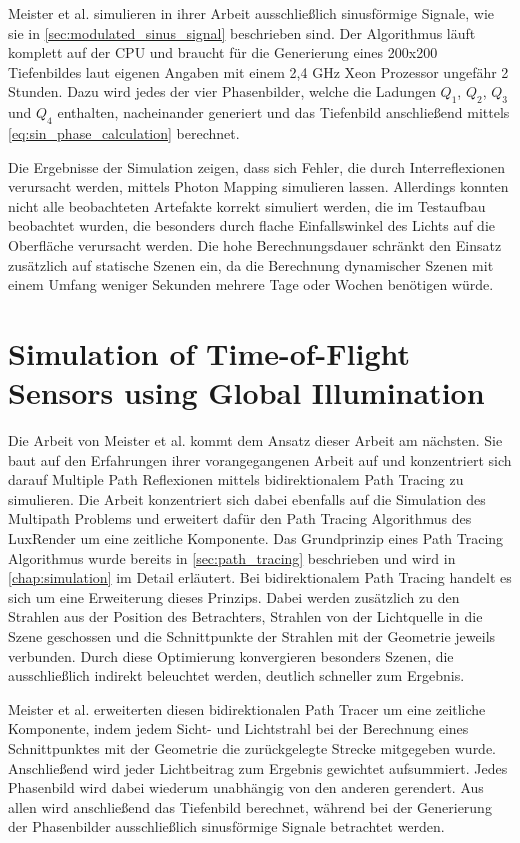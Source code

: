 \documentclass[thesis.tex]{subfiles}
\begin{document}
Meister et al. \cite{bib:Meister2012PhotonMB} simulieren in ihrer Arbeit ausschließlich sinusförmige Signale, wie sie in \autoref{sec:modulated_sinus_signal} beschrieben sind. Der Algorithmus läuft komplett auf der CPU und braucht für die Generierung eines 200x200 Tiefenbildes laut eigenen Angaben mit einem 2,4 GHz Xeon Prozessor ungefähr 2 Stunden. Dazu wird jedes der vier Phasenbilder, welche die Ladungen $Q_1$, $Q_2$, $Q_3$ und $Q_4$ enthalten, nacheinander generiert und das Tiefenbild anschließend mittels \autoref{eq:sin_phase_calculation} berechnet.

Die Ergebnisse der Simulation zeigen, dass sich Fehler, die durch Interreflexionen verursacht werden, mittels Photon Mapping simulieren lassen. Allerdings konnten nicht alle beobachteten Artefakte korrekt simuliert werden, die im Testaufbau beobachtet wurden, die besonders durch flache Einfallswinkel des Lichts auf die Oberfläche verursacht werden. Die hohe Berechnungsdauer schränkt den Einsatz zusätzlich auf statische Szenen ein, da die Berechnung dynamischer Szenen mit einem Umfang weniger Sekunden mehrere Tage oder Wochen benötigen würde.

\section{Simulation of Time-of-Flight Sensors using Global Illumination}

Die Arbeit von Meister et al. \cite{bib:Meister2013} kommt dem Ansatz dieser Arbeit am nächsten. Sie baut auf den Erfahrungen ihrer vorangegangenen Arbeit \cite{bib:Meister2012PhotonMB} auf und konzentriert sich darauf Multiple Path Reflexionen mittels bidirektionalem Path Tracing zu simulieren. Die Arbeit konzentriert sich dabei ebenfalls auf die Simulation des Multipath Problems und erweitert dafür den Path Tracing Algorithmus des LuxRender um eine zeitliche Komponente. Das Grundprinzip eines Path Tracing Algorithmus wurde bereits in \autoref{sec:path_tracing} beschrieben und wird in \autoref{chap:simulation} im Detail erläutert. Bei bidirektionalem Path Tracing handelt es sich um eine Erweiterung dieses Prinzips. Dabei werden zusätzlich zu den Strahlen aus der Position des Betrachters, Strahlen von der Lichtquelle in die Szene geschossen und die Schnittpunkte der Strahlen mit der Geometrie jeweils verbunden. Durch diese Optimierung konvergieren besonders Szenen, die ausschließlich indirekt beleuchtet werden, deutlich schneller zum Ergebnis.

Meister et al. \cite{bib:Meister2013} erweiterten diesen bidirektionalen Path Tracer um eine zeitliche Komponente, indem jedem Sicht- und Lichtstrahl bei der Berechnung eines Schnittpunktes mit der Geometrie die zurückgelegte Strecke mitgegeben wurde. Anschließend wird jeder Lichtbeitrag zum Ergebnis gewichtet aufsummiert. Jedes Phasenbild wird dabei wiederum unabhängig von den anderen gerendert. Aus allen wird anschließend das Tiefenbild berechnet, während bei der Generierung der Phasenbilder ausschließlich sinusförmige Signale betrachtet werden.
\end{document}

